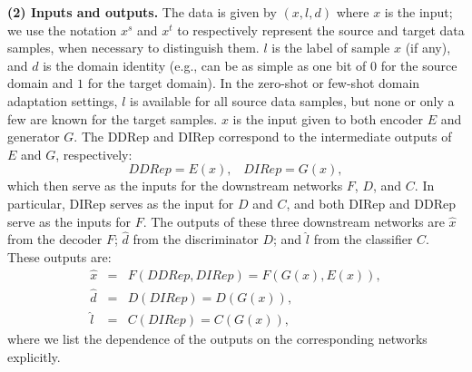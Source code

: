 \documentclass{article}
\newcommand\todo[1]{\textcolor{red}{#1}}
\newcommand{\remove}[1]{}
\begin{document}
{\bf (2) Inputs and outputs.} The data is given by $(x,l,d)$ where $x$ is the input; we use the notation %
$x^s$ and $x^t$ to respectively represent the source and target data samples, when necessary to distinguish them. $l$ is the label of sample $x$ (if any), and $d$ is the domain identity (e.g., can be as simple as one bit of $0$ for the source domain and $1$ for the target domain). In the zero-shot or few-shot domain adaptation settings, $l$ is available for all source data samples, but none or only a few are known for the target samples. $x$ is the input given to both encoder $E$ and generator $G$. The DDRep and DIRep correspond to the intermediate outputs of $E$ and $G$, respectively:
 \begin{equation}
 DDRep=E(x),\;\;\; DIRep=G(x), 
 \end{equation}
which then serve as the inputs for the downstream networks $F$, $D$, and $C$. In particular, DIRep serves as the input for $D$ and $C$, and both DIRep and DDRep serve as the inputs for $F$. The outputs of these three downstream networks are $\hat{x}$ from the decoder $F$;  $\hat{d}$ from the discriminator $D$; and $\hat{l}$ from the classifier $C$. These outputs are:
\begin{eqnarray}
    \hat{x} &=& F(DDRep,DIRep)=F(G(x),E(x)),\\
    \hat{d} &=& D(DIRep)=D(G(x)),\\ \hat{l} &=&C(DIRep)=C(G(x)),
\end{eqnarray}
where we list the dependence of the outputs on the corresponding  networks explicitly. 

\remove{
\todo{Adrain: alternative write-up for inputs and outputs paragraph.}
The data is given by $(\bf{X,Y, d})$ where $\bf{X}$ is the input with $\bf{X_s}$ and $\bf{X_t}$ representing the source and target data respectively. $\bf{Y}$ is the label of the sample and and $\mathbf{d}$
is the domain identity. In the zero-shot or a-few-shot transfer learning settings, $\bf{Y_s}$ is available for all the source samples, but none or only a few labels $\bf{Y_t}$ are known for the target samples. $\bf{X}$ is the input for the shared encoder $E$ and the shared generator $G$. The DDRep ($DD$) and DIRep ($DI$) correspond to the intermediate outputs of $E$ and $G$, respectively:
 \begin{equation}
 DD=E(\mathbf{X}),\;\;\; DI=G(\mathbf{X}), 
 \end{equation}
which then serve as the inputs for the down stream networks $F$, $D$, and $C$. In particular, $DI$ serves as the input for $D$ and $C$, and both $DI$ and $DD$ serve as the input for $F$. The outputs of these three down stream networks are $\hat{\mathbf{X}}$ from the decoder $F$;  $\hat{\mathbf{d}}$ from the discriminator $D$; and and $\hat{\mathbf{Y}}$ from the classifier $C$. These outputs are: 
\begin{eqnarray}
    \hat{\mathbf{X}} &=& F(DD,DI)=F(G(\mathbf{X}),E(\mathbf{X})),\\
     \hat{\mathbf{Y}}&=&C(DI)=C(G(\mathbf{X})), \\
     \hat{\mathbf{d}} &=& D(DI)=D(G(\mathbf{X}))
\end{eqnarray}
where we list the dependence of the outputs on the corresponding  networks explicitly. }
\end{document}
